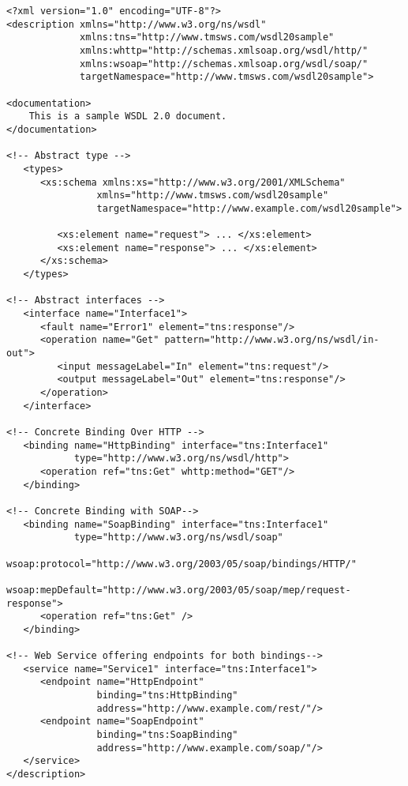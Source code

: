 \begin{verbatim}
<?xml version="1.0" encoding="UTF-8"?>
<description xmlns="http://www.w3.org/ns/wsdl"
             xmlns:tns="http://www.tmsws.com/wsdl20sample"
             xmlns:whttp="http://schemas.xmlsoap.org/wsdl/http/"
             xmlns:wsoap="http://schemas.xmlsoap.org/wsdl/soap/"
             targetNamespace="http://www.tmsws.com/wsdl20sample">

<documentation>
    This is a sample WSDL 2.0 document.
</documentation>

<!-- Abstract type -->
   <types>
      <xs:schema xmlns:xs="http://www.w3.org/2001/XMLSchema"
                xmlns="http://www.tmsws.com/wsdl20sample"
                targetNamespace="http://www.example.com/wsdl20sample">

         <xs:element name="request"> ... </xs:element>
         <xs:element name="response"> ... </xs:element>
      </xs:schema>
   </types>

<!-- Abstract interfaces -->
   <interface name="Interface1">
      <fault name="Error1" element="tns:response"/>
      <operation name="Get" pattern="http://www.w3.org/ns/wsdl/in-out">
         <input messageLabel="In" element="tns:request"/>
         <output messageLabel="Out" element="tns:response"/>
      </operation>
   </interface>

<!-- Concrete Binding Over HTTP -->
   <binding name="HttpBinding" interface="tns:Interface1"
            type="http://www.w3.org/ns/wsdl/http">
      <operation ref="tns:Get" whttp:method="GET"/>
   </binding>

<!-- Concrete Binding with SOAP-->
   <binding name="SoapBinding" interface="tns:Interface1"
            type="http://www.w3.org/ns/wsdl/soap"
            wsoap:protocol="http://www.w3.org/2003/05/soap/bindings/HTTP/"
            wsoap:mepDefault="http://www.w3.org/2003/05/soap/mep/request-response">
      <operation ref="tns:Get" />
   </binding>

<!-- Web Service offering endpoints for both bindings-->
   <service name="Service1" interface="tns:Interface1">
      <endpoint name="HttpEndpoint"
                binding="tns:HttpBinding"
                address="http://www.example.com/rest/"/>
      <endpoint name="SoapEndpoint"
                binding="tns:SoapBinding"
                address="http://www.example.com/soap/"/>
   </service>
</description>
\end{verbatim}
